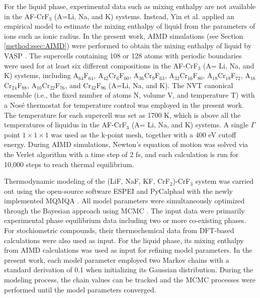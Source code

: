 For the liquid phase, experimental data such as mixing enthalpy are not available in the AF-CrF${_3}$ (A=Li, Na, and K) systems. Instead, Yin et al. \cite{yin2018thermodynamic, yin2015thermodynamic, yin2014thermodynamic} applied an empirical model to estimate the mixing enthalpy of liquid from the parameters of ions such as ionic radius. In the present work, AIMD simulations (see Section \ref{method:ssec:AIMD}) were performed to obtain the mixing enthalpy of liquid by VASP \cite{kresse1996efficient}. The supercells containing 108 or 128 atoms with periodic boundaries were used for at least six different compositions in the AF-CrF${_3}$ (A= Li, Na, and K) systems, including A$_{64}$F$_{64}$, A$_{42}$Cr$_6$F$_{60}$, A$_{36}$Cr$_9$F$_{63}$, A$_{32}$Cr$_{16}$F$_{80}$, A$_{18}$Cr$_{18}$F$_{72}$, A$_{16}$Cr$_{24}$F$_{88}$, A$_{10}$Cr$_{22}$F$_{76}$, and Cr$_{32}$F$_{96}$ (A=Li, Na, and K). The NVT canonical ensemble (i.e., the fixed number of atoms N, volume V, and temperature T) with a Nosé thermostat for temperature control \cite{nose1984unified} was employed in the present work. The temperature for each supercell was set as 1700 K, which is above all the temperatures of liquidus in the AF-CrF${_3}$ (A= Li, Na, and K) systems. A single $\Gamma$ point $1\times1\times1$ was used as the k-point mesh, together with a 400 eV cutoff energy. During AIMD simulations, Newton’s equation of motion was solved via the Verlet algorithm with a time step of 2 fs, and each calculation is run for 10,000 steps to reach thermal equilibrium.

Thermodynamic modeling of the (LiF, NaF, KF, CrF${_2}$)-CrF${_3}$ system was carried out using the open-source software ESPEI \cite{bocklund2019espei} and PyCalphad \cite{otis2017pycalphad} with the newly implemented MQMQA \cite{palma2023thermodynamic}. All model parameters were simultaneously optimized through the Bayesian approach using MCMC \cite{bocklund2019espei}. The input data were primarily experimental phase equilibrium data including two or more co-existing phases. For stochiometric compounds, their thermochemical data from DFT-based calculations were also used as input. For the liquid phase, its mixing enthalpy from AIMD calculations was used as input for refining model parameters. In the present work, each model parameter employed two Markov chains with a standard derivation of 0.1 when initializing its Gaussian distribution. During the modeling process, the chain values can be tracked and the MCMC processes were performed until the model parameters converged.

